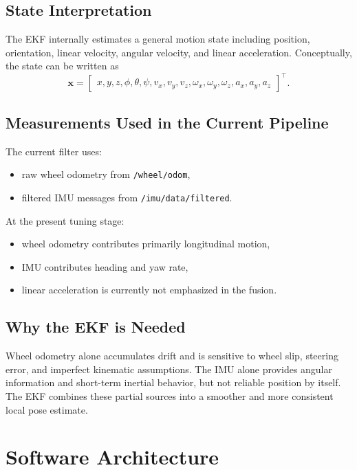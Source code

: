 \documentclass[12pt,a4paper]{report}
\begin{document}
\section{State Interpretation}
The EKF internally estimates a general motion state including position, orientation, linear velocity, angular velocity, and linear acceleration. Conceptually, the state can be written as
\begin{equation}
\mathbf{x} =
\begin{bmatrix}
x, y, z, \phi, \theta, \psi, v_x, v_y, v_z, \omega_x, \omega_y, \omega_z, a_x, a_y, a_z
\end{bmatrix}^{\top}.
\end{equation}

\section{Measurements Used in the Current Pipeline}
The current filter uses:
\begin{itemize}[leftmargin=*]
  \item raw wheel odometry from \texttt{/wheel/odom},
  \item filtered IMU messages from \texttt{/imu/data/filtered}.
\end{itemize}

At the present tuning stage:
\begin{itemize}[leftmargin=*]
  \item wheel odometry contributes primarily longitudinal motion,
  \item IMU contributes heading and yaw rate,
  \item linear acceleration is currently not emphasized in the fusion.
\end{itemize}

\section{Why the EKF is Needed}
Wheel odometry alone accumulates drift and is sensitive to wheel slip, steering error, and imperfect kinematic assumptions. The IMU alone provides angular information and short-term inertial behavior, but not reliable position by itself. The EKF combines these partial sources into a smoother and more consistent local pose estimate.

\chapter{Software Architecture}
\end{document}
